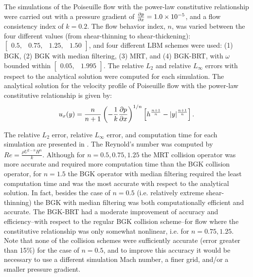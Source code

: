 The simulations of the Poiseuille flow with the power-law constitutive relationship were carried out with a pressure gradient of $\frac{\partial p}{\partial x} = 1.0 \times 10^{-5}$, and a flow consistency index of $k = 0.2$.
The flow behavior index, $n$, was varied between the four different values (from shear-thinning to shear-thickening): $\begin{bmatrix}0.5,&0.75,&1.25,& 1.50\end{bmatrix}$, and four different LBM schemes were used: (1) BGK, (2) BGK with median filtering, (3) MRT, and (4) BGK-BRT, with $\omega$ bounded within $\begin{bmatrix}0.05,&1.995\end{bmatrix}$. 
The relative $L_2$ and relative $L_{\infty}$ errors with respect to the analytical solution were computed for each simulation.
The analytical solution for the velocity profile of Poiseuille flow with the power-law constitutive relationship is given by:
\begin{equation} \label{eq:analytical-power-law}
  u_x(y) = \frac{n}{n+1}\left(-\frac{1}{k}\frac{\partial p}{\partial x}\right)^{1/n}\left[h^{\frac{n+1}{n}} - |y|^{\frac{n+1}{n}}\right].
\end{equation}

The relative $L_2$ error, relative $L_{\infty}$ error, and computation time for each simulation are presented in .
The Reynold's number was computed by $Re = \frac{\rho U^{2-n} H^n}{k}$.
Although for $n = 0.5, 0.75, 1.25$ the MRT collision operator was more accurate and required more computation time than the BGK collision operator, for $n = 1.5$ the BGK operator with median filtering required the least computation time and was the most accurate with respect to the analytical solution.
In fact, besides the case of $n = 0.5$ (i.e. relatively extreme shear-thinning) the BGK with median filtering was both computationally efficient and accurate.
The BGK-BRT had a moderate improvement of accuracy and efficiency--with respect to the regular BGK collision scheme--for flow where the constitutive relationship was only somewhat nonlinear, i.e. for $n = 0.75, 1.25$.
Note that none of the collision schemes were sufficiently accurate (error greater than 15\%) for the case of $n = 0.5$, and to improve this accuracy it would be necessary to use a different simulation Mach number, a finer grid, and/or a smaller pressure gradient.


